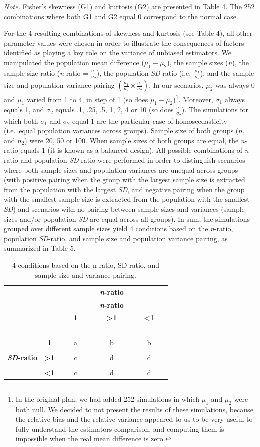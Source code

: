 \documentclass[
  man,floatsintext]{apa6}
\begin{document}
\emph{Note.} Fisher's skewness (G1) and kurtosis (G2) are presented in Table 4. The 252 combinations where both G1 and G2 equal 0 correspond to the normal case.

For the 4 resulting combinations of skewness and kurtosis (see Table 4), all other parameter values were chosen in order to illustrate the consequences of factors identified as playing a key role on the variance of unbiased estimators. We manipulated the population mean difference (\(\mu_1-\mu_2\)), the sample sizes (\emph{n}), the sample size ratio (\emph{n}-ratio = \(\frac{n_1}{n_2}\)), the population \emph{SD}-ratio (i.e.~\(\frac{\sigma_1}{\sigma_2}\)), and the sample size and population variance pairing \(\left(\frac{n_1}{n_2}\times\frac{\sigma_1}{\sigma_2} \right)\). In our scenarios, \(\mu_2\) was always 0 and \(\mu_1\) varied from 1 to 4, in step of 1 (so does \(\mu_1-\mu_2\))\footnote{In the original plan, we had added 252 simulations in which $\mu_1$ and $\mu_2$ were both null. We decided to not present the results of these simulations, because the relative bias and the relative variance appeared to us to be very useful to fully understand the estimators comparison, and computing them is impossible when the real mean difference is zero.}. Moreover, \(\sigma_1\) always equals 1, and \(\sigma_2\) equals .1, .25, .5, 1, 2, 4 or 10 (so does \(\frac{\sigma_1}{\sigma_2}\)). The simulations for which both \(\sigma_1\) and \(\sigma_2\) equal 1 are the particular case of homoscedasticity (i.e.~equal population variances across groups). Sample size of both groups (\(n_1\) and \(n_2\)) were 20, 50 or 100. When sample sizes of both groups are equal, the \emph{n}-ratio equals 1 (it is known as a balanced design). All possible combinations of \emph{n}-ratio and population \emph{SD}-ratio were performed in order to distinguish scenarios where both sample sizes and population variances are unequal across groups (with positive pairing when the group with the largest sample size is extracted from the population with the largest \emph{SD}, and negative pairing when the group with the smallest sample size is extracted from the population with the smallest \emph{SD}) and scenarios with no pairing between sample sizes and variances (sample sizes and/or population \emph{SD} are equal across all groups). In sum, the simulations grouped over different sample sizes yield 4 conditions based on the \emph{n}-ratio, population \emph{SD}-ratio, and sample size and population variance pairing, as summarized in Table 5.

\begin{longtable}[]{@{}ccccc@{}}
\caption{4 conditions based on the n-ratio, SD-ratio, and sample size and variance pairing.}\tabularnewline
\toprule
& & & \textbf{\emph{n}-ratio} &\tabularnewline
\midrule
\endfirsthead
\toprule
& & & \textbf{\emph{n}-ratio} &\tabularnewline
\midrule
\endhead
& & \textbf{1} & \textbf{\textgreater1} & \textbf{\textless1}\tabularnewline
& & ------------ & ------------- & -------------\tabularnewline
& \textbf{1} & a & b & b\tabularnewline
& & & &\tabularnewline
\textbf{\emph{SD}-ratio} & \textbf{\textgreater1} & c & d & d\tabularnewline
& & & &\tabularnewline
& \textbf{\textless1} & c & d & d\tabularnewline
\bottomrule
\end{longtable}
\end{document}

